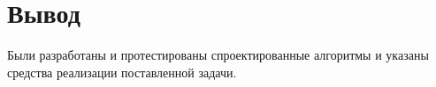 	\section*{Вывод}
	
	
	Были разработаны и протестированы спроектированные алгоритмы и указаны средства реализации поставленной задачи.
    	
\newpage